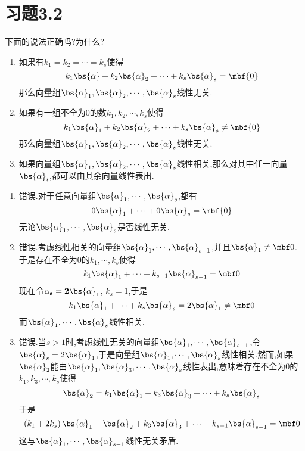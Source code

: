 \documentclass{ctexart}
\begin{document}
\section*{习题3.2}
\begin{homework}[1]
    下面的说法正确吗?为什么?
    \begin{enumerate}[label=\tbf{(\arabic*)},topsep=0pt,parsep=0pt,itemsep=0pt,partopsep=0pt]
        \item 如果有$k_1=k_2=\cdots=k_s$使得
            \[k_1\bs{\alpha}+k_2\bs{\alpha}_2+\cdots+k_s\bs{\alpha}_s=\mbf{0}\]
            那么向量组$\bs{\alpha}_1,\bs{\alpha}_2,\cdots,\bs{\alpha}_s$线性无关.
        \item 如果有一组不全为$0$的数$k_1,k_2,\cdots,k_s$使得
            \[k_1\bs{\alpha}_1+k_2\bs{\alpha}_2+\cdots+k_s\bs{\alpha}_s\neq\mbf{0}\]
            那么向量组$\bs{\alpha}_1,\bs{\alpha}_2,\cdots,\bs{\alpha}_s$线性无关.
        \item 如果向量组$\bs{\alpha}_1,\bs{\alpha}_2,\cdots,\bs{\alpha}_s$线性相关,那么对其中任一向量$\bs{\alpha}_i$,都可以由其余向量线性表出.
    \end{enumerate}
\end{homework}
\begin{solution}
    \begin{enumerate}[label=\tbf{(\arabic*)},topsep=0pt,parsep=0pt,itemsep=0pt,partopsep=0pt]
        \item 错误.对于任意向量组$\bs{\alpha}_1,\cdots,\bs{\alpha}_s$,都有
            \[0\bs{\alpha}_1+\cdots+0\bs{\alpha}_s=\mbf{0}\]
            无论$\bs{\alpha}_1,\cdots,\bs{\alpha}_s$是否线性无关.
        \item 错误.考虑线性相关的向量组$\bs{\alpha}_1,\cdots,\bs{\alpha}_{s-1}$,并且$\bs{\alpha}_1\neq\mbf0$.于是存在不全为$0$的$k_1,\cdots,k_s$使得
            \[k_1\bs{\alpha}_1+\cdots+k_{s-1}\bs{\alpha}_{s-1}=\mbf0\]
            现在令$\bf{\alpha}_s=2\bs{\alpha}_1$, $k_s=1$,于是
            \[k_1\bs{\alpha}_1+\cdots+k_s\bs{\alpha}_s=2\bs{\alpha}_1\neq\mbf0\]
            而$\bs{\alpha}_1,\cdots,\bs{\alpha}_s$线性相关.
        \item 错误.当$s>1$时,考虑线性无关的向量组$\bs{\alpha}_1,\cdots,\bs{\alpha}_{s-1}$,令$\bs{\alpha}_s=2\bs{\alpha}_1$,于是向量组$\bs{\alpha}_1,\cdots,\bs{\alpha}_s$线性相关.然而,如果$\bs{\alpha}_2$能由$\bs{\alpha}_1,\bs{\alpha}_3,\cdots,\bs{\alpha}_s$线性表出,意味着存在不全为$0$的$k_1,k_3,\cdots,k_s$使得
            \[\bs{\alpha}_2=k_1\bs{\alpha}_1+k_3\bs{\alpha}_3+\cdots+k_s\bs{\alpha}_s\]
            于是
            \[\left(k_1+2k_s\right)\bs{\alpha}_1-\bs{\alpha}_2+k_3\bs{\alpha}_3+\cdots+k_{s-1}\bs{\alpha}_{s-1}=\mbf0\]
            这与$\bs{\alpha}_1,\cdots,\bs{\alpha}_{s-1}$线性无关矛盾.
    \end{enumerate}
\end{solution}
\end{document}
